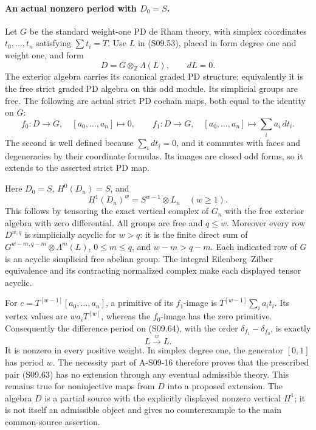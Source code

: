 \paragraph{An actual nonzero period with $D_0=S$.}
Let $G$ be the standard weight-one PD de Rham theory,
with simplex coordinates $t_0,\ldots,t_n$ satisfying
$\sum t_i=T$.  Use $L$ in (S09.53), placed in form
degree one and weight one, and form
\[
 D=G\otimes_{\mathbb Z}\Lambda(L),\qquad dL=0.
 \tag{S09.62}
\]
The exterior algebra carries its canonical graded PD
structure; equivalently it is the free strict graded
PD algebra on this odd module.  Its simplicial groups
are free.  The following are actual strict PD cochain
maps, both equal to the identity on $G$:
\[
 f_0:D\to G,\quad [a_0,\ldots,a_n]\longmapsto0,
 \qquad
 f_1:D\to G,\quad [a_0,\ldots,a_n]
                              \longmapsto\sum_i a_i\,dt_i.
 \tag{S09.63}
\]
The second is well defined because $\sum_i dt_i=0$,
and it commutes with faces and degeneracies by their
coordinate formulas.  Its images are closed odd forms,
so it extends to the asserted strict PD map.

Here $D_0=S$, $H^0(D_n)=S$, and
\[
 H^1(D_n)^w= S^{w-1}\otimes L_n\quad(w\geq1).
 \tag{S09.64}
\]
This follows by tensoring the exact vertical complex
of $G_n$ with the free exterior algebra with zero
differential.  All groups are free and $q\leq w$.
Moreover every row $D^{w,q}$ is simplicially acyclic
for $w>q$: it is the finite direct sum of
$G^{w-m,q-m}\otimes\Lambda^m(L)$, $0\leq m\leq q$,
and $w-m>q-m$.  Each indicated row of $G$ is an
acyclic simplicial free abelian group.  The integral
Eilenberg--Zilber equivalence and its contracting
normalized complex make each displayed tensor
acyclic.

For $c=T^{[w-1]}[a_0,\ldots,a_n]$, a primitive of
its $f_1$-image is $T^{[w-1]}\sum_i a_i t_i$.
Its vertex values are $wa_iT^{[w]}$, whereas the
$f_0$-image has the zero primitive.  Consequently
the difference period on (S09.64), with the order
$\delta_{f_1}-\delta_{f_0}$, is exactly
\[
                       L\xrightarrow{\ w\ }L.        \tag{S09.65}
\]
It is nonzero in every positive weight.  In simplex
degree one, the generator $[0,1]$ has period $w$.
The necessity part of A-S09-16 therefore proves that
the prescribed pair (S09.63) has no extension through
any eventual admissible theory.  This remains true
for noninjective maps from $D$ into a proposed
extension.  The algebra $D$ is a partial source with
the explicitly displayed nonzero vertical $H^1$;
it is not itself an admissible object and gives no
counterexample to the main common-source assertion.

